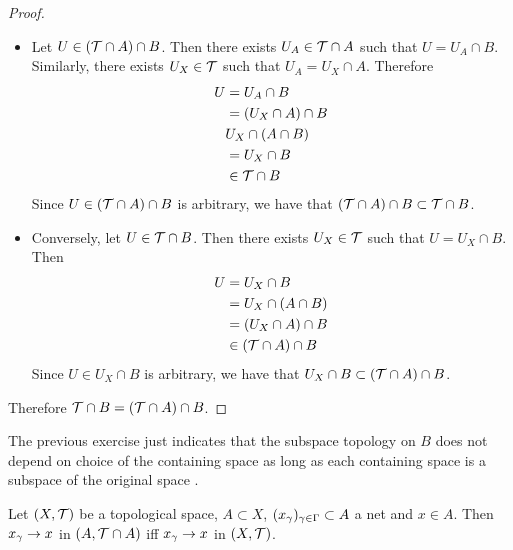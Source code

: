 \documentclass{book}
\begin{document}
\begin{proof}\
	\begin{itemize}
		\item Let $U \in (\mathcal{T} \cap A) \cap B$. Then there exists $U_A \in \mathcal{T} \cap A$ such that $U = U_A \cap B$. Similarly, there exists $U_X \in \mathcal{T}$ such that $U_A = U_X \cap A$. Therefore 
		\begin{align*}
			U
			& = U_A \cap B \\
			& = (U_X \cap A) \cap B \\
			& U_X \cap (A \cap B) \\
			& = U_X \cap B \\
			& \in \mathcal{T} \cap B
		\end{align*}
		Since $U \in (\mathcal{T} \cap A) \cap B$ is arbitrary, we have that $(\mathcal{T} \cap A) \cap B \subset \mathcal{T} \cap B$. \\
		\item Conversely, let $U \in \mathcal{T} \cap B$. Then there exists $U_X \in \mathcal{T}$ such that $U = U_X \cap B$. Then 
		\begin{align*}
			U
			& = U_X \cap B \\
			& = U_X \cap (A \cap B) \\
			& = (U_X \cap A) \cap B \\
			& \in (\mathcal{T} \cap A) \cap B
		\end{align*}
		Since $U \in U_X \cap B$ is arbitrary, we have that $U_X \cap B \subset (\mathcal{T} \cap A) \cap B$. 
	\end{itemize}
	Therefore $\mathcal{T} \cap B = (\mathcal{T} \cap A) \cap B$.
\end{proof}

\begin{note}
	The previous exercise just indicates that the subspace topology on $B$ does not depend on choice of the containing space as long as each containing space is a subspace of the original space .
\end{note}

\begin{ex} 
	Let $(X, \mathcal{T})$ be a topological space, $A \subset X$, $(x_{\gamma})_{\gamma \in \Gamma} \subset A$ a net and $x \in A$. Then $x_{\gamma} \rightarrow x$ in $(A,\mathcal{T} \cap A)$ iff $x_{\gamma} \rightarrow x$ in $(X,\mathcal{T})$.
\end{ex}
\end{document}
